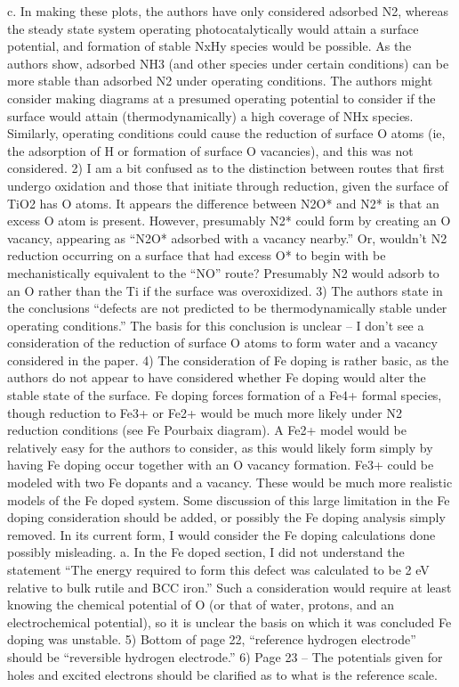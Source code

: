 c.      In making these plots, the authors have only considered adsorbed N2, whereas the steady state system operating photocatalytically would attain a surface potential, and formation of stable NxHy species would be possible.  As the authors show, adsorbed NH3 (and other species under certain conditions) can be more stable than adsorbed N2 under operating conditions.  The authors might consider making diagrams at a presumed operating potential to consider if the surface would attain (thermodynamically) a high coverage of NHx species.  Similarly, operating conditions could cause the reduction of surface O atoms (ie, the adsorption of H or formation of surface O vacancies), and this was not considered.
2)       I am a bit confused as to the distinction between routes that first undergo oxidation and those that initiate through reduction, given the surface of TiO2 has O atoms.  It appears the difference between N2O* and N2* is that an excess O atom is present.  However, presumably N2* could form by creating an O vacancy, appearing as “N2O* adsorbed with a vacancy nearby.”  Or, wouldn’t N2 reduction occurring on a surface that had excess O* to begin with be mechanistically equivalent to the “NO” route?  Presumably N2 would adsorb to an O rather than the Ti if the surface was overoxidized.
3)      The authors state in the conclusions “defects are not predicted to be thermodynamically stable under operating conditions.”  The basis for this conclusion is unclear – I don’t see a consideration of the reduction of surface O atoms to form water and a vacancy considered in the paper.
4)      The consideration of Fe doping is rather basic, as the authors do not appear to have considered whether Fe doping would alter the stable state of the surface.  Fe doping forces formation of a Fe4+ formal species, though reduction to Fe3+ or Fe2+ would be much more likely under N2 reduction conditions (see Fe Pourbaix diagram).  A Fe2+ model would be relatively easy for the authors to consider, as this would likely form simply by having Fe doping occur together with an O vacancy formation.   Fe3+ could be modeled with two Fe dopants and a vacancy.  These would be much more realistic models of the Fe doped system.  Some discussion of this large limitation in the Fe doping consideration should be added, or possibly the Fe doping analysis simply removed.  In its current form, I would consider the Fe doping calculations done possibly misleading.
a.      In the Fe doped section, I did not understand the statement “The energy required to form this defect was calculated to be 2 eV relative to bulk rutile and BCC iron.”  Such a consideration would require at least knowing the chemical potential of O (or that of water, protons, and an electrochemical potential), so it is unclear the basis on which it was concluded Fe doping was unstable.
5)       Bottom of page 22, “reference hydrogen electrode” should be “reversible hydrogen electrode.”
6)      Page 23 – The potentials given for holes and excited electrons should be clarified as to what is the reference scale.
